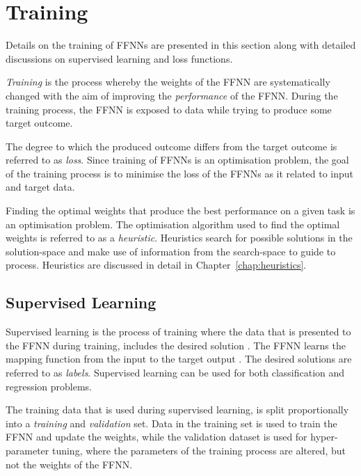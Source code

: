 \section{Training}
\label{sec:anns:training}

Details on the training of \acp{FFNN} are presented in this section along with
detailed discussions on supervised learning and loss functions.

\textit{Training} is the process whereby the weights of the \acs{FFNN} are systematically changed with the aim of improving the \textit{performance} of the \acs{FFNN}. During the training process, the \acs{FFNN} is exposed to data while trying to produce some target outcome.

The degree to which the produced outcome differs from the target outcome is referred to as \textit{loss}. Since training of \acp{FFNN} is an optimisation problem, the goal of the training process is to minimise the loss of the \acp{FFNN} as it related to input and target data.

Finding the optimal weights that produce the best performance on a given task is an optimisation problem. The optimisation algorithm used to find the optimal weights is referred to as a \textit{heuristic}. Heuristics search for possible solutions in the solution-space and make use of information from the search-space to guide to process. Heuristics are discussed in detail in Chapter~\ref{chap:heuristics}.


\subsection{Supervised Learning}
\label{sec:anns:training:supervised_learning}

Supervised learning is the process of training where the data that is presented to the \acs{FFNN} during training, includes the desired solution \cite{ref:geron:2017}.  The \acs{FFNN} learns the mapping function from the input to the target output \cite{ref:brownlee:2016}. The desired solutions are referred to as \textit{labels}. Supervised learning can be used for both classification and regression problems.

The training data that is used during supervised learning, is split proportionally into a \textit{training} and \textit{validation} set. Data in the training set is used to train the \acs{FFNN} \cite{ref:james:2013} and update the weights, while the validation dataset is used for hyper-parameter tuning, where the parameters of the training process are altered, but not the weights of the \acs{FFNN}.

